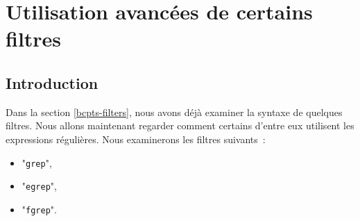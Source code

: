 %
%

\setcounter{remarque-cnt}{1}
\setcounter{example-cnt}{1}
\chapter{\label{adv-filters}Utilisation avanc{\'e}es de certains filtres}
\thispagestyle{fancy}

\section{Introduction}

Dans la section \ref{bcpts-filters}, nous avons d{\'e}j{\`a} examiner la
syntaxe de quelques filtres. Nous allons maintenant regarder comment
certains d'entre eux utilisent les expressions r{\'e}guli{\`e}res. Nous
examinerons les filtres suivants~:
\begin{itemize}
	\item	"{\tt grep}",
	\item	"{\tt egrep}",
	\item	"{\tt fgrep}".
\end{itemize}

